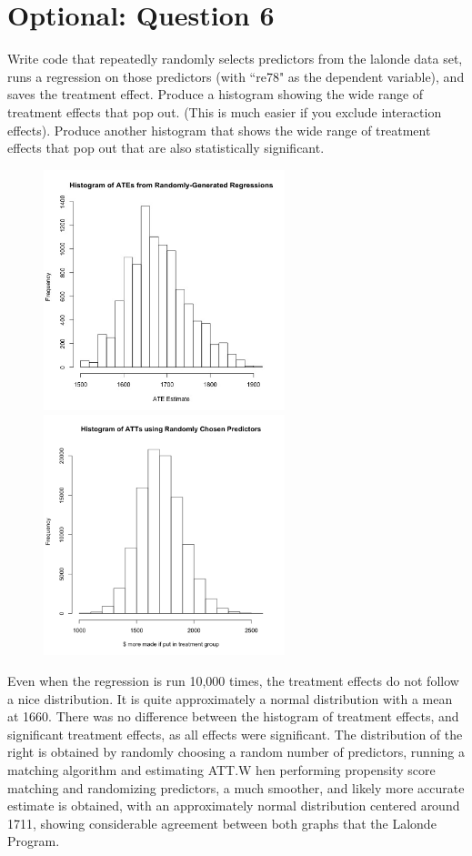 \documentclass[11pt, oneside]{article}
\begin{document}
\newpage
\section*{Optional: Question 6}
Write code that repeatedly randomly selects predictors from the lalonde data set, runs a regression on those predictors (with ``re78"	 as the dependent variable), and saves the treatment effect.  Produce a histogram showing the wide range of treatment effects that pop out. (This is much easier if you exclude interaction effects). Produce another histogram that shows the wide range of treatment effects that pop out that are also statistically significant.
\begin{figure}[h]
	\includegraphics[width = 7cm, height = 7cm]{atehist.jpg}
	\includegraphics[width = 7cm, height = 7cm]{histatt.png}
\end{figure}
Even when the regression is run 10,000 times, the treatment effects do not follow a nice distribution. It is quite approximately a normal distribution with a mean at 1660. There was no difference between the histogram of treatment effects, and significant treatment effects, as all effects were significant. The distribution of the right is obtained by randomly choosing a random number of predictors, running a matching algorithm and estimating ATT.W hen performing propensity score matching and randomizing predictors, a much smoother, and likely more accurate estimate is obtained, with an approximately normal distribution centered around 1711, showing considerable agreement between both graphs that the Lalonde Program.
\end{document}
